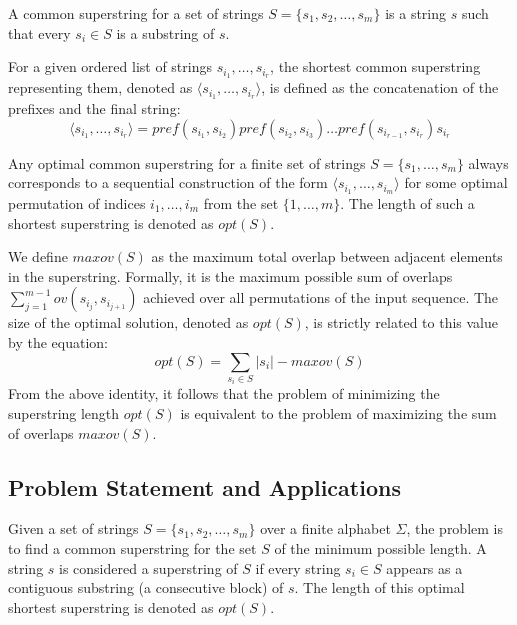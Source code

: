 \begin{definition}
A common superstring for a set of strings $S = \{s_1, s_2, \dots, s_m\}$ is a
string $s$ such that every $s_i \in S$ is a substring of $s$.
\end{definition}

\begin{definition}
For a given ordered list of strings $s_{i_1}, \dots, s_{i_r}$, the shortest
common superstring representing them, denoted as $\langle s_{i_1}, \dots,
s_{i_r} \rangle$, is defined as the concatenation of the prefixes and the final
string:
\begin{equation}
\langle s_{i_1}, \dots, s_{i_r} \rangle = \textit{pref}(s_{i_1}, s_{i_2}) \textit{pref}(s_{i_2}, s_{i_3}) \dots \textit{pref}(s_{i_{r-1}}, s_{i_r}) s_{i_r}
\end{equation}
\end{definition}

Any optimal common superstring for a finite set of strings $S = \{s_1, \dots,
s_m\}$ always corresponds to a sequential construction of the form $\langle
s_{i_1}, \dots, s_{i_m} \rangle$ for some optimal permutation of indices $i_1,
\dots, i_m$ from the set $\{1, \dots, m\}$. The length of such a shortest
superstring is denoted as $\textit{opt}(S)$.

We define $\textit{maxov}(S)$ as the maximum total overlap between adjacent
elements in the superstring. Formally, it is the maximum possible sum of
overlaps $\sum_{j=1}^{m-1} ov(s_{i_j}, s_{i_{j+1}})$ achieved over all
permutations of the input sequence. The size of the optimal solution, denoted as
$\textit{opt}(S)$, is strictly related to this value by the equation:
\begin{equation}
\textit{opt}(S) = \sum_{s_i \in S} |s_i| - \textit{maxov}(S)
\end{equation}
From the above identity, it follows that the problem of minimizing the
superstring length $\textit{opt}(S)$ is equivalent to the problem of maximizing
the sum of overlaps $\textit{maxov}(S)$.

\subsection{Problem Statement and Applications}

\begin{problem}
Given a set of strings $S = \{s_1, s_2, \dots, s_m\}$ over a finite alphabet
$\Sigma$, the problem is to find a common superstring for the set $S$ of the
minimum possible length. A string $s$ is considered a superstring of $S$ if
every string $s_i \in S$ appears as a contiguous substring (a consecutive block)
of $s$. The length of this optimal shortest superstring is denoted as $opt(S)$.
\end{problem}

